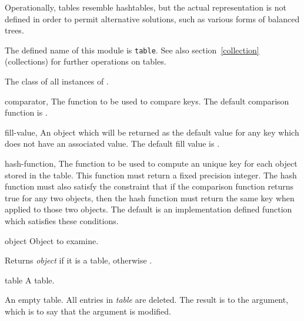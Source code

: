 \label{table}
%
\begin{optRationale}
    Operationally, tables resemble hashtables, but the actual representation is
    not defined in order to permit alternative solutions, such as various forms
    of balanced trees.
\end{optRationale}
%
\begin{optDefinition}
The defined name of this module is {\tt table}.  See also
section~\ref{collection} (collections) for further operations on tables.

%
The class of all instances of .
%
\begin{initoptions}
    \item[comparator, \classref{function}]%
    The function to be used to compare keys.  The default comparison function is
    .

    \item[fill-value, \classref{object}]%
    An object which will be returned as the default value for any key which does
    not have an associated value.  The default fill value is \nil{}.

    \item[hash-function, \classref{function}]%
    The function to be used to compute an unique key for each object stored in
    the table.  This function must return a fixed precision integer.  The hash
    function must also satisfy the constraint that if the comparison function
    returns true for any two objects, then the hash function must return the
    same key when applied to those two objects.  The default is an
    implementation defined function which satisfies these conditions.
\end{initoptions}

%
\begin{arguments}
    \item[object] Object to examine.
\end{arguments}
%
\result%
Returns {\em object\/} if it is a table, otherwise \nil{}.

%
\begin{arguments}
    \item[table] A table.
\end{arguments}
%
\result%
An empty table.
%
\remarks%
All entries in {\em table\/} are deleted.  The result is  to the
argument, which is to say that the argument is modified.
%
\end{optDefinition}
